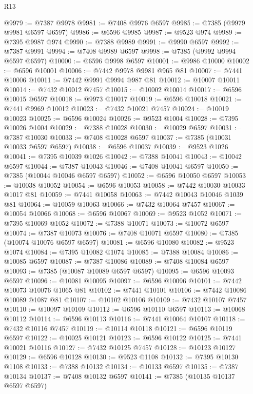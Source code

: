 \begin{lexlean}{R13}
\begin{coremodule}
@9979 := @7387 @9978
@9981 := @7408 @9976 @6597
@9985 := @7385 (@9979 @9981 @6597 @6597)
@9986 := @6596 @9985
@9987 := @9523 @974
@9989 := @7395 @9987 @974
@9990 := @7388 @9989
@9991 := @9990 @6597
@9992 := @7387 @9991
@9994 := @7408 @9989 @6597
@9998 := @7385 (@9992 @9994 @6597 @6597)
@10000 := @6596 @9998 @6597
@10001 := @9986 @10000
@10002 := @6596 @10001
@10006 := @7442 @9978 @9981 @965 @81
@10007 := @7441 @10006
@10011 := @7442 @9991 @9994 @987 @81
@10012 := @10007 @10011
@10014 := @7432 @10012 @7457
@10015 := @10002 @10014
@10017 := @6596 @10015 @6597
@10018 := @9973 @10017
@10019 := @6596 @10018
@10021 := @7441 @9969 @10012
@10023 := @7432 @10021 @7457
@10024 := @10019 @10023
@10025 := @6596 @10024
@10026 := @9523 @1004
@10028 := @7395 @10026 @1004
@10029 := @7388 @10028
@10030 := @10029 @6597
@10031 := @7387 @10030
@10033 := @7408 @10028 @6597
@10037 := @7385 (@10031 @10033 @6597 @6597)
@10038 := @6596 @10037
@10039 := @9523 @1026
@10041 := @7395 @10039 @1026
@10042 := @7388 @10041
@10043 := @10042 @6597
@10044 := @7387 @10043
@10046 := @7408 @10041 @6597
@10050 := @7385 (@10044 @10046 @6597 @6597)
@10052 := @6596 @10050 @6597
@10053 := @10038 @10052
@10054 := @6596 @10053
@10058 := @7442 @10030 @10033 @1017 @81
@10059 := @7441 @10058
@10063 := @7442 @10043 @10046 @1039 @81
@10064 := @10059 @10063
@10066 := @7432 @10064 @7457
@10067 := @10054 @10066
@10068 := @6596 @10067
@10069 := @9523 @1052
@10071 := @7395 @10069 @1052
@10072 := @7388 @10071
@10073 := @10072 @6597
@10074 := @7387 @10073
@10076 := @7408 @10071 @6597
@10080 := @7385 (@10074 @10076 @6597 @6597)
@10081 := @6596 @10080
@10082 := @9523 @1074
@10084 := @7395 @10082 @1074
@10085 := @7388 @10084
@10086 := @10085 @6597
@10087 := @7387 @10086
@10089 := @7408 @10084 @6597
@10093 := @7385 (@10087 @10089 @6597 @6597)
@10095 := @6596 @10093 @6597
@10096 := @10081 @10095
@10097 := @6596 @10096
@10101 := @7442 @10073 @10076 @1065 @81
@10102 := @7441 @10101
@10106 := @7442 @10086 @10089 @1087 @81
@10107 := @10102 @10106
@10109 := @7432 @10107 @7457
@10110 := @10097 @10109
@10112 := @6596 @10110 @6597
@10113 := @10068 @10112
@10114 := @6596 @10113
@10116 := @7441 @10064 @10107
@10118 := @7432 @10116 @7457
@10119 := @10114 @10118
@10121 := @6596 @10119 @6597
@10122 := @10025 @10121
@10123 := @6596 @10122
@10125 := @7441 @10021 @10116
@10127 := @7432 @10125 @7457
@10128 := @10123 @10127
@10129 := @6596 @10128
@10130 := @9523 @1108
@10132 := @7395 @10130 @1108
@10133 := @7388 @10132
@10134 := @10133 @6597
@10135 := @7387 @10134
@10137 := @7408 @10132 @6597
@10141 := @7385 (@10135 @10137 @6597 @6597)

\end{coremodule}
\end{lexlean}
